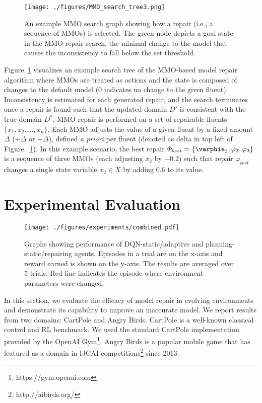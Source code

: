 \documentclass[letterpaper]{article} %
\begin{document}
\begin{figure}
	\centering
	\texttt{[image: ./figures/MMO\_search\_tree3.png]}
	\caption{An example MMO search graph showing how a repair (i.e., a sequence of MMOs) is selected. The green node depicts a goal state in the MMO repair search, the minimal change to the model that causes the inconsistency to fall below the set threshold.}
	\label{fig:mmo_search}
\end{figure}

Figure~\ref{fig:mmo_search} visualizes an example search tree of the MMO-based model repair algorithm where MMOs are treated as actions and the state is composed of changes to the default model (0 indicates no change to the given fluent). Inconsistency is estimated for each generated repair, and the search terminates once a repair is found such that the updated domain $D'$ is consistent with the true domain $D^*$. MMO repair is performed on a set of repairable fluents $\{x_1, x_2, ..., x_n\}$. Each MMO adjusts the value of a given fluent by a fixed amount $\Delta$ ($+\Delta$ or $-\Delta$), defined \emph{a priori} per fluent (denoted as delta in top left of Figure.~\ref{fig:mmo_search}). In this example scenario, the best repair $\varPhi_{best} = \{\varphie_3, \varphi_3, \varphi_3\}$ is a sequence of three MMOs (each adjusting $x_2$ by $+0.2$) such that repair $\varphi_{best}$ changes a single state variable $x_2 \in X$ by adding $0.6$ to its value.



\section{Experimental Evaluation}
\begin{figure*}
    \centering
    \texttt{[image: ./figures/experiments/combined.pdf]}
    \caption{Graphs showing performance of DQN-static/adaptive and planning-static/repairing agents. Episodes in a trial are on the x-axis and reward earned is shown on the y-axis. The results are averaged over $5$ trials. Red line indicates the episode where environment parameters were changed.}
    \label{fig:combined_results}
\end{figure*}
In this section, we evaluate the efficacy of model repair in evolving environments and demonstrate its capability to improve an inaccurate model. We report results from two domains: CartPole and Angry Birds. CartPole is a well-known classical control and RL benchmark. We used the standard CartPole implementation provided by the OpenAI Gym\footnote{https://gym.openai.com}. Angry Birds is a popular mobile game that has featured as a domain in IJCAI competitions\footnote{http://aibirds.org/} since 2013. 
\end{document}
